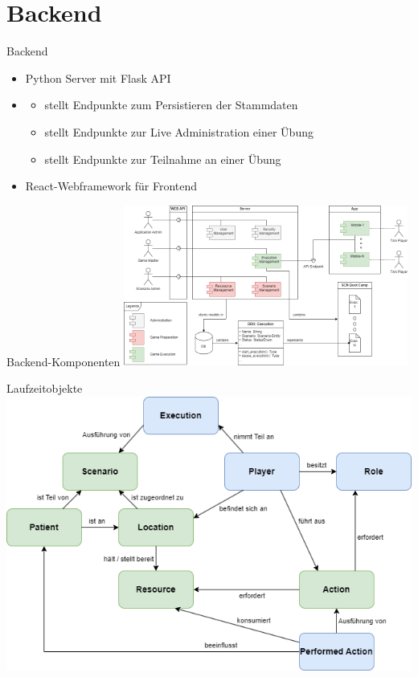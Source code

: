 \section{Backend}


\begin{frame}{Backend}
	\begin{itemize}
		\item Python Server mit Flask API
		\item \begin{itemize}
			\item stellt Endpunkte zum Persistieren der Stammdaten
			\item stellt Endpunkte zur Live Administration einer Übung
			\item stellt Endpunkte zur Teilnahme an einer Übung
		\end{itemize}
		\item React-Webframework für Frontend
	\end{itemize}
\end{frame}


\begin{frame}{Backend-Komponenten}
	\centering
	\includegraphics[width=0.7\textwidth]{images/server/component_diagram.png}
\end{frame}


\begin{frame}{Laufzeitobjekte}
	\centering
	\includegraphics[height=.86\textheight]{images/server_laufzeit_objekte.png}
\end{frame}


